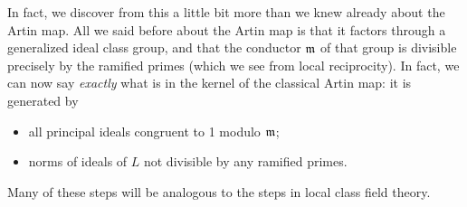 In fact, we discover from this a little bit more than we knew already about
the Artin map. All we said before about the Artin map is that it factors
through a generalized ideal class group, and that the conductor $\mathfrak{m}$
of that group is divisible precisely by the ramified primes (which
we see from local reciprocity). In fact, we can now say \emph{exactly}
what is in the kernel of the classical Artin map: it is generated by
\begin{itemize}
\item all principal ideals congruent to 1 modulo $\mathfrak{m}$;
\item norms of ideals of $L$ not divisible by any ramified primes.
\end{itemize}



Many of these steps will be analogous to the steps in local class field theory.
